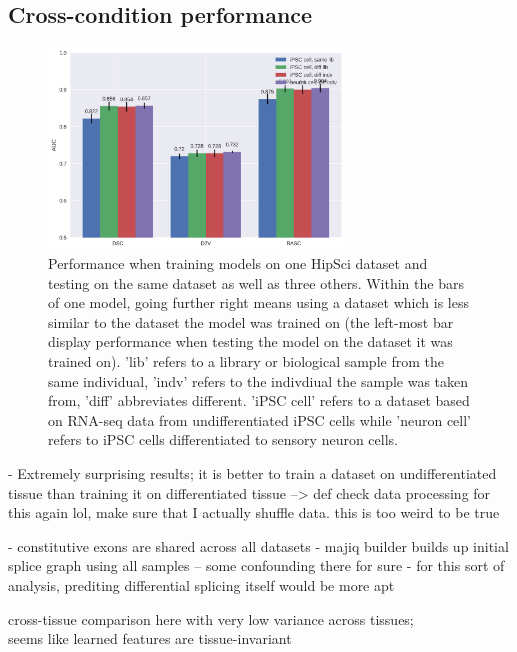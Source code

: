 \subsection{Cross-condition performance} \label{subsec:hipsci_ipsc_majiq}

\begin{figure}
	\centering\includegraphics[width=0.7\textwidth]{../visualizations/ch5-results/majiq_comparison_barcharts.png} 
	\caption{Performance when training models on one HipSci dataset and testing on the same dataset as well as three others. Within the bars of one model, going further right means using a dataset which is less similar to the dataset the model was trained on (the left-most bar display performance when testing the model on the dataset it was trained on). 'lib' refers to a library or biological sample from the same individual, 'indv' refers to the indivdiual the sample was taken from, 'diff' abbreviates different. 'iPSC cell' refers to a dataset based on RNA-seq data from undifferentiated iPSC cells while 'neuron cell' refers to iPSC cells differentiated to sensory neuron cells. }
	\label{fig:majiq_comparison_barcharts}
\end{figure}

- Extremely surprising results; it is better to train a dataset on undifferentiated tissue than training it on differentiated tissue --> def check data processing for this again lol, make sure that I actually shuffle data. this is too weird to be true

- constitutive exons are shared across all datasets
- majiq builder builds up initial splice graph using all samples -- some confounding there for sure
- for this sort of analysis, prediting differential splicing itself would be more apt

cross-tissue comparison here with very low variance across tissues;\\
seems like learned features are tissue-invariant\\

